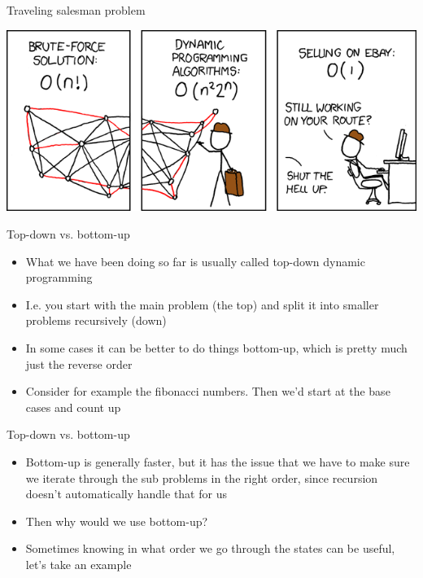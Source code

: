 \documentclass{beamer}
\begin{document}
\begin{frame}{Traveling salesman problem}
    \vspace{40pt}
    \begin{center}
    \includegraphics[scale=0.4]{tsp.png}
    \end{center}
\end{frame}

\begin{frame}[plain]{Top-down vs. bottom-up}
    \begin{itemize}
        \item What we have been doing so far is usually called top-down dynamic programming
        \item I.e. you start with the main problem (the top) and split it into smaller problems recursively (down)
        \item In some cases it can be better to do things bottom-up, which is pretty much just the reverse order
        \item Consider for example the fibonacci numbers. Then we'd start at the base cases and count up
    \end{itemize}
\end{frame}


\begin{frame}[plain]{Top-down vs. bottom-up}
    \begin{itemize}
        \item Bottom-up is generally faster, but it has the issue that we have to make sure we iterate through the sub problems in the right order, since recursion doesn't automatically handle that for us
        \item Then why would we use bottom-up?
        \item Sometimes knowing in what order we go through the states can be useful, let's take an example
    \end{itemize}
\end{frame}
\end{document}
